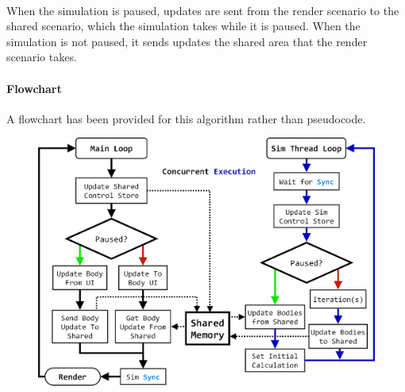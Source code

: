 \paragraph{}
When the simulation is paused, updates are sent from the render scenario to the shared scenario, which the simulation takes while it is paused. When the simulation is not paused, it sends updates the shared area that the render scenario takes.

\pagebreak

\paragraph{Flowchart}
A flowchart has been provided for this algorithm rather than pseudocode.
\begin{figure}[h]
  \centering  
  \includegraphics[width=\textwidth]{img/updateflow.png}
\end{figure}

